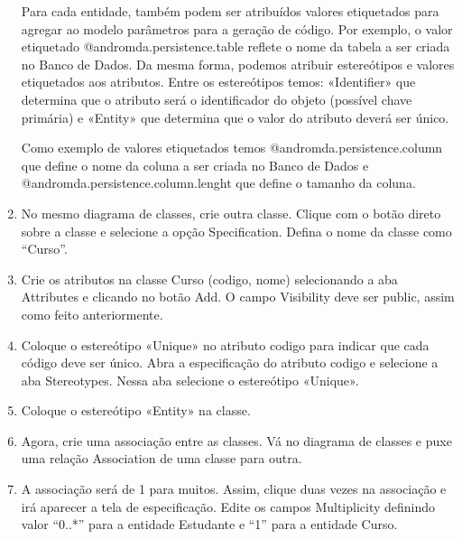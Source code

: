 \begin{enumerate}
Para cada entidade, também podem ser atribuídos valores etiquetados para agregar ao modelo parâmetros para a geração de código. Por exemplo, o valor etiquetado @andromda.persistence.table reflete o nome da tabela a ser criada no Banco de Dados. Da mesma forma, podemos atribuir estereótipos e valores etiquetados aos atributos. Entre os estereótipos temos: «Identifier» que determina que o atributo será o identificador do objeto (possível chave primária) e «Entity» que determina que o valor do atributo deverá ser único.

Como exemplo de valores etiquetados temos @andromda.persistence.column que define o nome da coluna a ser criada no Banco de Dados e @andromda.persistence.column.lenght que define o tamanho da coluna.

\item No mesmo diagrama de classes, crie outra classe. Clique com o botão direto sobre a classe e selecione a opção Specification. Defina o nome da classe como “Curso”.
	
\item Crie os atributos na classe Curso (codigo, nome) selecionando a aba Attributes e clicando no botão Add. O campo Visibility deve ser public, assim como feito anteriormente.

\item Coloque o estereótipo «Unique» no atributo codigo para indicar que cada código deve ser único. Abra a especificação do atributo codigo e selecione a aba Stereotypes. Nessa aba selecione o estereótipo «Unique».
	
\item Coloque o estereótipo «Entity» na classe.
	
\item Agora, crie uma associação entre as classes. Vá no diagrama de classes e puxe uma relação Association de uma classe para outra.
	
\item A associação será de 1 para muitos. Assim, clique duas vezes na associação e irá aparecer a tela de especificação. Edite os campos Multiplicity definindo valor “0..*” para a entidade Estudante e “1” para a entidade Curso.


\end{enumerate}
